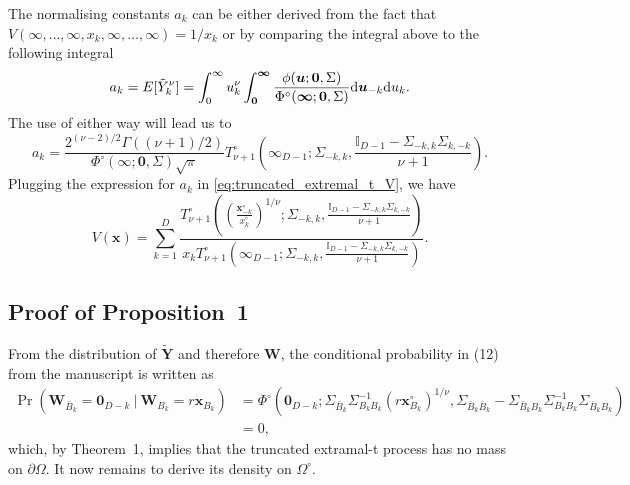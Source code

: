 \documentclass[12pt]{article}
\begin{document}
The normalising constants $a_k$ can be either derived from the fact that $V(\infty,\dots,\infty,x_k,\infty,\dots,\infty) = 1/x_k$ or by comparing the integral above to the following integral 
\begin{equation*}
\label{eq:normalising_trunc}
a_k = E[\tilde Y_k^\nu] = \int_0^\infty u_k^\nu \int_{\bm 0}^{\bm \infty} \frac{\phi(\bm u; \bm 0,\Sigma)}{\Phi^\circ(\bm \infty;\bm 0, \Sigma)}\text d \bm u_{-k}\text d u_k.	
\end{equation*}
The use of either way will lead us to 
\begin{equation*}
\label{eq:truncate_extremal_t_a}
a_k =\frac{2^{(\nu-2)/2}\Gamma((\nu+1)/2)}{\Phi^\circ(\bm \infty;\bm 0, \Sigma)\sqrt{\pi}} T_{\nu+1}^\circ\left(
\bm \infty_{D-1}
;\Sigma_{-k,k},\frac{\mathbb{I}_{D-1}-\Sigma_{-k,k}\Sigma_{k,-k}}{\nu+1}\right).
\end{equation*}
Plugging the expression for $a_k$ in \eqref{eq:truncated_extremal_t_V}, we have 
\begin{equation*}
V(\bm x) = \sum_{k=1}^D \frac{T_{\nu+1}^\circ\left( \left(\frac{\bm x_{-k}^\circ}{x_k^\circ}\right)^{1/\nu} ;\Sigma_{-k,k},\frac{\mathbb{I}_{D-1}-\Sigma_{-k,k}\Sigma_{k,-k}}{\nu+1}\right)}{x_k T_{\nu+1}^\circ\left(\bm \infty_{D-1};\Sigma_{-k,k},\frac{\mathbb{I}_{D-1}-\Sigma_{-k,k}\Sigma_{k,-k}}{\nu+1}\right)}.	
\end{equation*}

\subsection{Proof of Proposition~1}

From the distribution of $\tilde{\bm Y}$ and therefore $\bm W$, the conditional probability in (12) from the manuscript is written as
%
\begin{align*}
\Pr(\bm W_{\bar{B}_k} = \bm 0_{D-k} \ | \ \bm W_{B_k} = r \bm x_{B_k} )
& = \Phi^\circ \left( \bm 0_{D-k};
\Sigma_{\bar{B}_k}\Sigma_{B_k B_k}^{-1} \left(r \bm x_{B_k}^\circ\right)^{1/\nu},\Sigma_{\bar{B}_k\bar{B}_k}-\Sigma_{\bar{B}_k B_k}\Sigma_{B_k B_k}^{-1}\Sigma_{\bar{B}_k B_k} \right) \\
& = 0,
\end{align*}
%
which, by Theorem~1, implies that the truncated extramal-t process has no mass on $\partial\Omega$. It now remains to derive its density on $\Omega^\circ$. 
\end{document}
